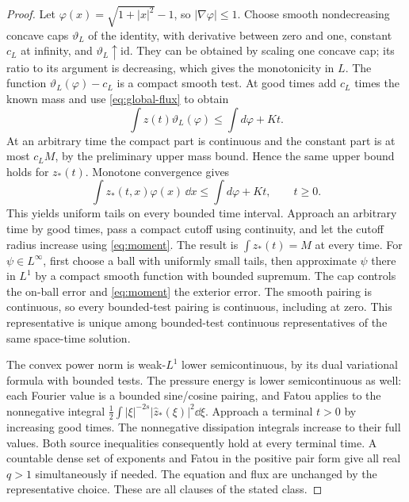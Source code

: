 \begin{proof}
Let $\varphi(x)=\sqrt{1+|x|^2}-1$, so $|\nabla\varphi|\leq1$.
Choose smooth nondecreasing concave caps $\vartheta_L$ of the identity,
with derivative between zero and one, constant $c_L$ at infinity, and
$\vartheta_L\uparrow\mathrm{id}$. They can be obtained by scaling one
concave cap; its ratio to its argument is decreasing, which gives the
monotonicity in $L$. The function
$\vartheta_L(\varphi)-c_L$ is a compact smooth test. At good times add
$c_L$ times the known mass and use \eqref{eq:global-flux} to obtain
\[
 \int z(t)\vartheta_L(\varphi)\leq\int d\varphi+Kt.
\]
At an arbitrary time the compact part is continuous and the constant
part is at most $c_LM$, by the preliminary upper mass bound. Hence the
same upper bound holds for $z_*(t)$. Monotone convergence gives
\begin{equation}\label{eq:moment}
 \int z_*(t,x)\varphi(x)\,\dd x\leq\int d\varphi+Kt,
 \qquad t\geq0.
\end{equation}
This yields uniform tails on every bounded time interval. Approach an
arbitrary time by good times, pass a compact cutoff using continuity,
and let the cutoff radius increase using \eqref{eq:moment}. The result
is $\int z_*(t)=M$ at every time. For $\psi\in L^\infty$, first choose
a ball with uniformly small tails, then approximate $\psi$ there in
$L^1$ by a compact smooth function with bounded supremum. The cap
controls the on-ball error and \eqref{eq:moment} the exterior error.
The smooth pairing is continuous, so every bounded-test pairing is
continuous, including at zero. This representative is unique among
bounded-test continuous representatives of the same space-time solution.

The convex power norm is weak-$L^1$ lower semicontinuous, by its dual
variational formula with bounded tests. The pressure energy is lower
semicontinuous as well: each Fourier value is a bounded sine/cosine
pairing, and Fatou applies to the nonnegative integral
$\tfrac12\int|\xi|^{-2s}|\widehat z_*(\xi)|^2\dd\xi$.
Approach a terminal $t>0$ by increasing good times. The nonnegative
dissipation integrals increase to their full values. Both source
inequalities consequently hold at every terminal time. A countable
dense set of exponents and Fatou in the positive pair form give all
real $q>1$ simultaneously if needed. The equation and flux are unchanged
by the representative choice. These are all clauses of the stated class.
\end{proof}

